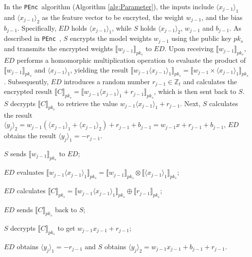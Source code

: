 \documentclass[conference]{IEEEtran}
\newcommand{\PEnc}{\texttt{PEnc}}
\begin{document}
In the \PEnc~algorithm (Algorithm \ref{alg:Parameter}), the inputs include $\langle x_{j-1}\rangle_1$ and $\langle x_{j-1}\rangle_2$ as the feature vector to be encryted, the weight $w_{j-1}$, and the bias $b_{j-1}$. Specifically, $ED$ holds $\langle x_{j-1}\rangle_1$, while $S$ holds $\langle x_{j-1}\rangle_2$, $w_{j-1}$ and $b_{j-1}$. As described in \PEnc~, $S$ encrypts the model weights $w_{j-1}$ using the public key $pk_s$ and transmits the encrypted weights $\llbracket w_{j-1} \rrbracket_{pk_s}$ to $ED$. Upon receiving $\llbracket w_{j-1} \rrbracket_{pk_s}$, $ED$ performs a homomorphic multiplication operation to evaluate the product of $\llbracket w_{j-1} \rrbracket_{pk_s}$ and $\langle x_{j-1} \rangle_1$, yielding the result $\llbracket w_{j-1} \langle x_{j-1} \rangle_1\rrbracket_{pk_s} = \llbracket w_{j-1} \times \langle x_{j-1} \rangle_1 \rrbracket_{pk_s}$. Subsequently, $ED$ introduces a random number $r_{j-1}\in \mathbb{Z}_t$ and calculates the encrypted result $\llbracket C \rrbracket_{pk_s}=\llbracket w_{j-1} \langle x_{j-1} \rangle_1 + r_{j-1} \rrbracket_{pk_s}$, which is then sent back to $S$. $S$ decrypts $\llbracket C \rrbracket_{pk_s}$ to retrieve the value $w_{j-1}\langle x_{j-1} \rangle_1+r_{j-1}$. Next, $S$ calculates the result $\langle y_j\rangle_2= w_{j-1}(\langle x_{j-1} \rangle_1 + \langle x_{j-1} \rangle_2)+r_{j-1}+b_{j-1}=w_{j-1}x+r_{j-1}+b_{j-1}$, $ED$ obtains the result $\langle y_j\rangle_1=-r_{j-1}$. 
\begin{algorithm}[htbp]
	\caption{\PEnc$(\langle x_{j-1} \rangle_1,\langle x_{j-1} \rangle_2,w_{j-1},b_{j-1}) \rightarrow (\langle y_j\rangle_1, \langle y_j\rangle_2)$}
    \label{alg:Parameter}
    \LinesNumbered
     $S$ sends $\llbracket w_{j-1}\rrbracket_{pk_s}$ to $ED$;
    
     $ED$ evaluates $\llbracket w_{j-1}\langle x_{j-1} \rangle_1 \rrbracket_{pk_s} = \llbracket w_{j-1} \rrbracket_{pk_s} \otimes \llbracket \langle x_{j-1} \rangle_1 \rrbracket_{pk_s}$;
    
     $ED$  calculates $\llbracket C\rrbracket_{pk_s} = \llbracket w_{j-1}\langle x_{j-1} \rangle_1 \rrbracket_{pk_s} \oplus \llbracket r_{j-1} \rrbracket_{pk_s}$;
     
     $ED$ sends $\llbracket C\rrbracket_{pk_s}$ back to $S$;
    
     $S$ decrypts $\llbracket C\rrbracket_{pk_s}$ to get $w_{j-1} x_{j-1} + r_{j-1}$;
     
     $ED$ obtains $\langle y_j\rangle_1=-r_{j-1}$ and $S$ obtains $\langle y_j\rangle_2 = w_{j-1} x_{{j-1}}  + b_{j-1} + r_{j-1}$.
\end{algorithm}
\end{document}
